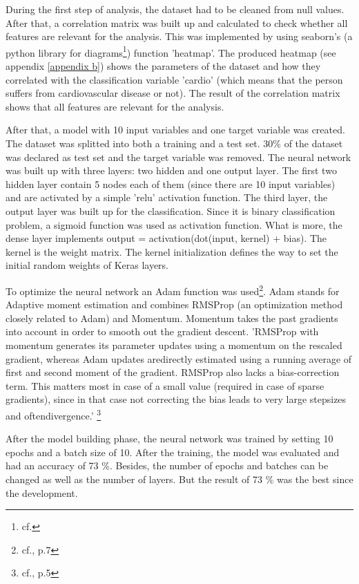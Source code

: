 During the first step of analysis, the dataset had to be cleaned from null values. After that, a correlation matrix was built up and calculated to check whether all features are relevant for the analysis. This was implemented by using seaborn's (a python library for diagrams\footnote{cf.\autocite{seaborn}}) function 'heatmap'. The produced heatmap (see appendix \ref{appendix b}) shows the parameters of the dataset and how they correlated with the classification variable 'cardio' (which means that the person suffers from cardiovascular disease or not). The result of the correlation matrix shows that all features are relevant for the analysis.

After that, a model with 10 input variables and one target variable was created. The dataset was splitted into both a training and a test set. 30\% of the dataset was declared as test set and the target variable was removed. 
The neural network was built up with three layers: two hidden and one output layer. The first two hidden layer contain 5 nodes each of them (since there are 10 input variables) and are activated by a simple 'relu' activation function. The third layer, the output layer was built up for the classification. Since it is binary classification problem, a sigmoid function was used as activation function. What is more, the dense layer implements output = activation(dot(input, kernel) + bias). The kernel is the weight matrix. The kernel initialization defines the way to set the initial random weights of Keras layers.

To optimize the neural network an Adam function was used\footnote{cf.\autocite{adam}, p.7}. Adam stands for Adaptive moment estimation and combines RMSProp (an optimization method closely related to Adam) and Momentum. Momentum takes the past gradients into account in order to smooth out the gradient descent.
'RMSProp with momentum generates its parameter updates using a momentum on the rescaled gradient, whereas Adam updates aredirectly estimated using a running average of first and second moment of the gradient. RMSProp also lacks a bias-correction term. This matters most in case of a small value \textbeta (required in case of sparse gradients), since in that case not correcting the bias leads to very large stepsizes and oftendivergence.' \footnote{cf.\autocite{adam}, p.5}

After the model building phase, the neural network was trained by setting 10 epochs and a batch size of 10. 
After the training, the model was evaluated and had an accuracy of 73 \%. 
Besides, the number of epochs and batches can be changed as well as the number of layers. But the result of 73 \% was the best since the development.

